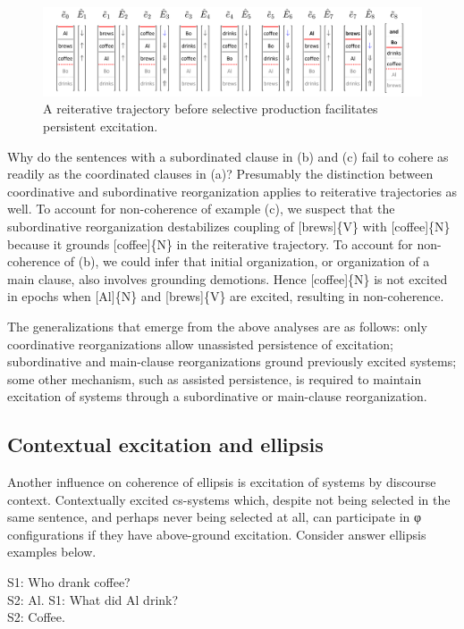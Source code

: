   
\begin{figure}
\includegraphics[width=\textwidth]{figures/Tilsen-img150.png}
\caption{A reiterative trajectory before selective production facilitates persistent excitation.}
\label{fig:7:6}
\end{figure}
 

  Why do the sentences with a subordinated clause in (b) and (c) fail to cohere as readily as the coordinated clauses in (a)? Presumably the distinction between coordinative and subordinative reorganization applies to reiterative trajectories as well. To account for non-coherence of example (c), we suspect that the subordinative reorganization destabilizes coupling of [brews]\{V\} with [coffee]\{N\} because it grounds [coffee]\{N\} in the reiterative trajectory. To account for non-coherence of (b), we could infer that initial organization, or organization of a main clause, also involves grounding demotions. Hence [coffee]\{N\} is not excited in epochs when [Al]\{N\} and [brews]\{V\} are excited, resulting in non-coherence. 

  The generalizations that emerge from the above analyses are as follows: only coordinative reorganizations allow unassisted persistence of excitation; subordinative and main-clause reorganizations ground previously excited systems; some other mechanism, such as assisted persistence, is required to maintain excitation of systems through a subordinative or main-clause reorganization. 

\subsection{Contextual excitation and ellipsis}

Another influence on coherence of ellipsis is excitation of systems by discourse context. Contextually excited cs-systems which, despite not being selected in the same sentence, and perhaps never being selected at all, can participate in φ configurations if they have above-ground excitation. Consider answer ellipsis examples below.

\ea
   \ea    S1:  {Who drank coffee?}\\  S2:  {Al}.
    \ex    S1:  {What did Al drink?}\\   S2:  {Coffee.}
\z
\z

